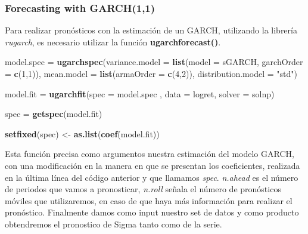 \documentclass[
]{book}
\newenvironment{Shaded}{\begin{snugshade}}{\end{snugshade}}
\newcommand{\AttributeTok}[1]{\textcolor[rgb]{0.13,0.29,0.53}{#1}}
\newcommand{\DecValTok}[1]{\textcolor[rgb]{0.00,0.00,0.81}{#1}}
\newcommand{\FunctionTok}[1]{\textcolor[rgb]{0.13,0.29,0.53}{\textbf{#1}}}
\newcommand{\NormalTok}[1]{#1}
\newcommand{\OtherTok}[1]{\textcolor[rgb]{0.56,0.35,0.01}{#1}}
\newcommand{\StringTok}[1]{\textcolor[rgb]{0.31,0.60,0.02}{#1}}
\begin{document}
\hypertarget{forecasting-with-garch11}{%
\subsubsection{Forecasting with GARCH(1,1)}\label{forecasting-with-garch11}}

Para realizar pronósticos con la estimación de un GARCH, utilizando la librería \emph{rugarch}, es necesario utilizar la función \textbf{ugarchforecast()}.

\begin{Shaded}
\begin{Highlighting}[]
\NormalTok{model.spec }\OtherTok{=} \FunctionTok{ugarchspec}\NormalTok{(}\AttributeTok{variance.model =} \FunctionTok{list}\NormalTok{(}\AttributeTok{model =} \StringTok{\textquotesingle{}sGARCH\textquotesingle{}}\NormalTok{, }
                                              \AttributeTok{garchOrder =} \FunctionTok{c}\NormalTok{(}\DecValTok{1}\NormalTok{,}\DecValTok{1}\NormalTok{)), }
                        \AttributeTok{mean.model =} \FunctionTok{list}\NormalTok{(}\AttributeTok{armaOrder =} \FunctionTok{c}\NormalTok{(}\DecValTok{4}\NormalTok{,}\DecValTok{2}\NormalTok{)), }
                        \AttributeTok{distribution.model =} \StringTok{"std"}\NormalTok{)}

\NormalTok{model.fit }\OtherTok{=} \FunctionTok{ugarchfit}\NormalTok{(}\AttributeTok{spec =}\NormalTok{ model.spec , }\AttributeTok{data =}\NormalTok{ logret, }
                      \AttributeTok{solver =} \StringTok{\textquotesingle{}solnp\textquotesingle{}}\NormalTok{)}

\NormalTok{spec }\OtherTok{=} \FunctionTok{getspec}\NormalTok{(model.fit)}

\FunctionTok{setfixed}\NormalTok{(spec) }\OtherTok{\textless{}{-}} \FunctionTok{as.list}\NormalTok{(}\FunctionTok{coef}\NormalTok{(model.fit))}
\end{Highlighting}
\end{Shaded}

Esta función precisa como argumentos nuestra estimación del modelo GARCH, con una modificación en la manera en que se presentan los coeficientes, realizada en la última línea del código anterior y que llamamos \emph{spec}. \emph{n.ahead} es el número de periodos que vamos a pronosticar, \emph{n.roll} señala el número de pronósticos móviles que utilizaremos, en caso de que haya más información para realizar el pronóstico. Finalmente damos como input nuestro set de datos y como producto obtendremos el pronostico de Sigma tanto como de la serie.
\end{document}
